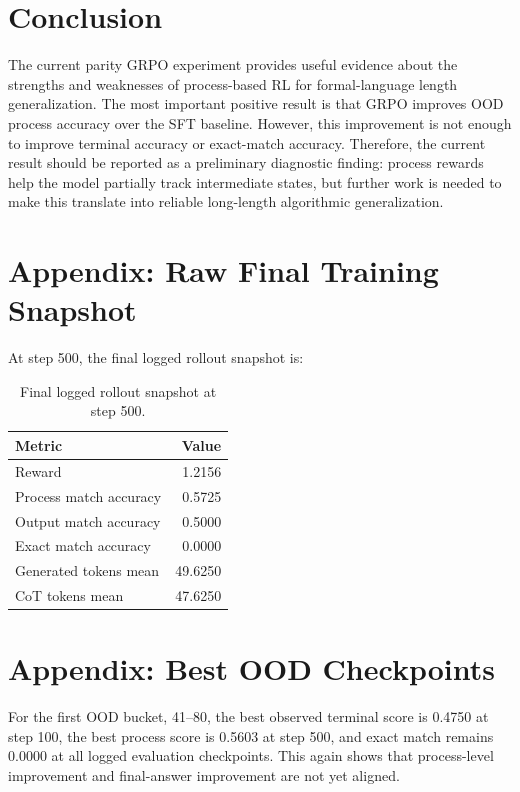 \documentclass[11pt]{article}
\begin{document}
\section{Conclusion}
The current parity GRPO experiment provides useful evidence about the strengths and weaknesses of process-based RL for formal-language length generalization. The most important positive result is that GRPO improves OOD process accuracy over the SFT baseline. However, this improvement is not enough to improve terminal accuracy or exact-match accuracy. Therefore, the current result should be reported as a preliminary diagnostic finding: process rewards help the model partially track intermediate states, but further work is needed to make this translate into reliable long-length algorithmic generalization.

\appendix
\section{Appendix: Raw Final Training Snapshot}
At step 500, the final logged rollout snapshot is:
\begin{table}[H]
\centering
\caption{Final logged rollout snapshot at step 500.}
\begin{tabular}{lr}
\toprule
Metric & Value \\
\midrule
Reward & 1.2156 \\
Process match accuracy & 0.5725 \\
Output match accuracy & 0.5000 \\
Exact match accuracy & 0.0000 \\
Generated tokens mean & 49.6250 \\
CoT tokens mean & 47.6250 \\
\bottomrule
\end{tabular}
\end{table}

\section{Appendix: Best OOD Checkpoints}
For the first OOD bucket, 41--80, the best observed terminal score is 0.4750 at step 100, the best process score is 0.5603 at step 500, and exact match remains 0.0000 at all logged evaluation checkpoints. This again shows that process-level improvement and final-answer improvement are not yet aligned.
\end{document}
